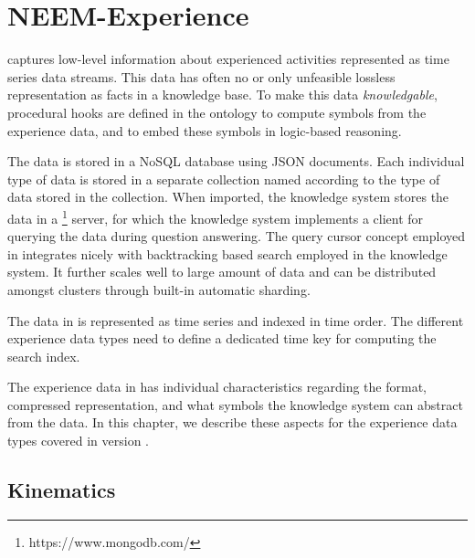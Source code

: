 \chapter{NEEM-Experience}
\label{ch:experience}

\neemexp captures low-level information about experienced activities
represented as time series data streams.
This data has often no or only unfeasible
lossless representation as facts in a knowledge base.
To make this data \emph{knowledgable}, procedural hooks
are defined in the ontology to compute symbols from the experience data,
and to embed these symbols in logic-based reasoning.

The data is stored in a NoSQL database using JSON documents.
Each individual type of data is stored in a separate collection
named according to the type of data stored in the collection.
When imported, the knowledge system stores the data in a
\mongodb\footnote{https://www.mongodb.com/} server, for which
the knowledge system implements a client for querying the data
during question answering.
The query cursor concept employed in \mongodb integrates
nicely with backtracking based search employed in the knowledge system.
It further scales well to large amount of data and can be distributed amongst
clusters through built-in automatic sharding.

The data in \neemexps is represented as time series
and indexed in time order.
The different experience data types need to define a dedicated
time key for computing the search index.


The experience data in \neems has individual characteristics regarding
the format, compressed representation, and what symbols the 
knowledge system can abstract from the data.
In this chapter, we describe these aspects for the experience data types covered 
in \neem version \neemversion.

\section{Kinematics}

